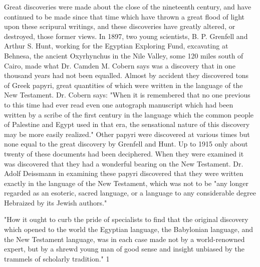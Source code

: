 Great discoveries were made about the close of the nineteenth century, and have continued to
be made since that time which have thrown a great flood of light upon these scripural
writings, and these discoveries have greatly altered, or destroyed, those former views. In
1897, two young scientists, B. P. Grenfell and Arthur S. Hunt, working for the Egyptian
Exploring Fund, excavating at Behnesa, the ancient Oxyrhynchus in the Nile Valley, some
120 miles south of Cairo, made what Dr. Camden M. Cobern says was a discovery that in
one thousand years had not been equalled. Almost by accident they discovered tons of Greek
papyri, great quantities of which were written in the language of the New Testament. Dr.
Cobern says: "When it is remembered that no one previous to this time had ever read even
one autograph manuscript which had been written by a scribe of the first century in the
language which the common people of Palestine and Egypt used in that era, the sensational
nature of this discovery may be more easily realized." Other papyri were discovered at
various times but none equal to the great discovery by Grenfell and Hunt. Up to 1915 only
about twenty of these documents had been deciphered. When they were examined it was
discovered that they had a wonderful bearing on the New Testament. Dr. Adolf Deissmann in
examining these papyri discovered that they were written exactly in the language of the New
Testament, which was not to be "any longer regarded as an esoteric, sacred language, or a
language to any considerable degree Hebraized by its Jewish authors."

"How it ought to curb the pride of specialists to find that the original discovery which opened
to the world the Egyptian language, the Babylonian language, and the New Testament
language, was in each case made not by a world-renowned expert, but by a shrewd young
man of good sense and insight unbiased by the trammels of scholarly tradition." 1

